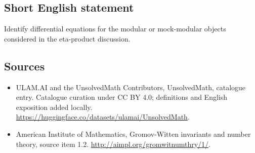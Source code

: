 \documentclass[11pt]{article}
\begin{document}
\subsection{Short English statement}
Identify differential equations for the modular or mock-modular objects considered in the eta-product discussion.
\subsection{Sources}
\begin{itemize}
\item[\hypertarget{source:statement:1}{S1}] ULAM.AI and the UnsolvedMath Contributors, UnsolvedMath, catalogue entry. Catalogue curation under CC BY 4.0; definitions and English exposition added locally.
\url{https://huggingface.co/datasets/ulamai/UnsolvedMath}.
\item[\hypertarget{source:statement:2}{S2}] American Institute of Mathematics, Gromov-Witten invariants and number theory, source item 1.2.
\url{http://aimpl.org/gromwitnumthry/1/}.
\end{itemize}
\label{end:statement}
\end{document}
